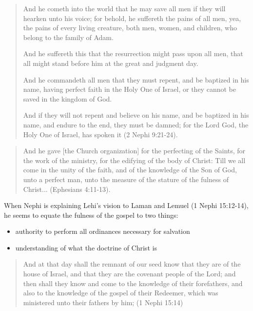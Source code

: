 \begin{quotation}
And he cometh into the world that he may save all men if they will hearken unto his voice; for behold, he suffereth the pains of all men, yea, the pains of every living creature, both men, women, and children, who belong to the family of Adam. 

And he suffereth this that the resurrection might pass upon all men, that all might stand before him at the great and judgment day. 

And he commandeth all men that they must repent, and be baptized in his name, having perfect faith in the Holy One of Israel, or they cannot be saved in the kingdom of God.

And if they will not repent and believe on his name, and be baptized in his name, and endure to the end, they must be damned; for the Lord God, the Holy One of Israel, has spoken it (2 Nephi 9:21-24).
\end{quotation}

\begin{quotation}
And he gave [the Church organization] for the perfecting of the Saints, for the work of the ministry, for the edifying of the body of Christ: Till we all come in the unity of the faith, and of the knowledge of the Son of God, unto a perfect man, unto the measure of the stature of the fulness of Christ... (Ephesians 4:11-13).
\end{quotation}

When Nephi is explaining Lehi's vision to Laman and Lemuel (1 Nephi 15:12-14), he seems to equate the fulness of the gospel to two things:

\begin{itemize}
  \item authority to perform all ordinances necessary for salvation
  \item understanding of what the doctrine of Christ is
\end{itemize}

\begin{quotation}
And at that day shall the remnant of our seed know that they are of the house of Israel, and that they are the covenant people of the Lord; and then shall they know and come to the knowledge of their forefathers, and also to the knowledge of the gospel of their Redeemer, which was ministered unto their fathers by him;  (1 Nephi 15:14)
\end{quotation}
